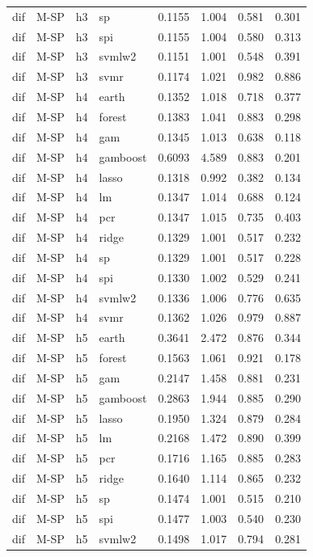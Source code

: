 \begin{ThreePartTable}
\begin{longtable}[t]{llclcccc}
dif & M-SP & h3 & sp & 0.1155 & 1.004 & 0.581 & 0.301\\
dif & M-SP & h3 & spi & 0.1155 & 1.004 & 0.580 & 0.313\\
dif & M-SP & h3 & svmlw2 & 0.1151 & 1.001 & 0.548 & 0.391\\
dif & M-SP & h3 & svmr & 0.1174 & 1.021 & 0.982 & 0.886\\
\addlinespace
dif & M-SP & h4 & earth & 0.1352 & 1.018 & 0.718 & 0.377\\
dif & M-SP & h4 & forest & 0.1383 & 1.041 & 0.883 & 0.298\\
dif & M-SP & h4 & gam & 0.1345 & 1.013 & 0.638 & 0.118\\
dif & M-SP & h4 & gamboost & 0.6093 & 4.589 & 0.883 & 0.201\\
dif & M-SP & h4 & lasso & 0.1318 & 0.992 & 0.382 & 0.134\\
dif & M-SP & h4 & lm & 0.1347 & 1.014 & 0.688 & 0.124\\
dif & M-SP & h4 & pcr & 0.1347 & 1.015 & 0.735 & 0.403\\
dif & M-SP & h4 & ridge & 0.1329 & 1.001 & 0.517 & 0.232\\
dif & M-SP & h4 & sp & 0.1329 & 1.001 & 0.517 & 0.228\\
dif & M-SP & h4 & spi & 0.1330 & 1.002 & 0.529 & 0.241\\
dif & M-SP & h4 & svmlw2 & 0.1336 & 1.006 & 0.776 & 0.635\\
dif & M-SP & h4 & svmr & 0.1362 & 1.026 & 0.979 & 0.887\\
\addlinespace
dif & M-SP & h5 & earth & 0.3641 & 2.472 & 0.876 & 0.344\\
dif & M-SP & h5 & forest & 0.1563 & 1.061 & 0.921 & 0.178\\
dif & M-SP & h5 & gam & 0.2147 & 1.458 & 0.881 & 0.231\\
dif & M-SP & h5 & gamboost & 0.2863 & 1.944 & 0.885 & 0.290\\
dif & M-SP & h5 & lasso & 0.1950 & 1.324 & 0.879 & 0.284\\
dif & M-SP & h5 & lm & 0.2168 & 1.472 & 0.890 & 0.399\\
dif & M-SP & h5 & pcr & 0.1716 & 1.165 & 0.885 & 0.283\\
dif & M-SP & h5 & ridge & 0.1640 & 1.114 & 0.865 & 0.232\\
dif & M-SP & h5 & sp & 0.1474 & 1.001 & 0.515 & 0.210\\
dif & M-SP & h5 & spi & 0.1477 & 1.003 & 0.540 & 0.230\\
dif & M-SP & h5 & svmlw2 & 0.1498 & 1.017 & 0.794 & 0.281\\

\end{longtable}
\end{ThreePartTable}
